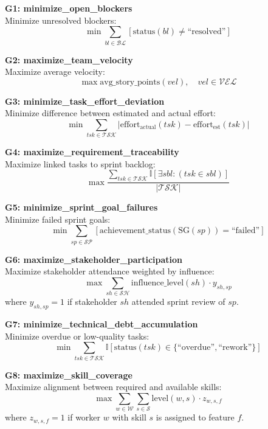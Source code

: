 \documentclass[12pt]{article}
\begin{document}
    \item \textbf{G1: minimize\_open\_blockers} \\
    Minimize unresolved blockers:
    \[
    \min \sum_{bl \in \mathcal{BL}} \left[ \text{status}(bl) \neq \text{``resolved''} \right]
    \]

    \item \textbf{G2: maximize\_team\_velocity} \\
    Maximize average velocity:
    \[
    \max \text{avg\_story\_points}(vel), \quad vel \in \mathcal{VEL}
    \]

    \item \textbf{G3: minimize\_task\_effort\_deviation} \\
    Minimize difference between estimated and actual effort:
    \[
    \min \sum_{tsk \in \mathcal{TSK}} | \text{effort}_{\text{actual}}(tsk) - \text{effort}_{\text{est}}(tsk) |
    \]

    \item \textbf{G4: maximize\_requirement\_traceability} \\
    Maximize linked tasks to sprint backlog:
    \[
    \max \frac{ \sum_{tsk \in \mathcal{TSK}} \mathbb{I}[\exists sbl : (tsk \in sbl)] }{ |\mathcal{TSK}| }
    \]

    \item \textbf{G5: minimize\_sprint\_goal\_failures} \\
    Minimize failed sprint goals:
    \[
    \min \sum_{sp \in \mathcal{SP}} \left[ \text{achievement\_status}(\text{SG}(sp)) = \text{``failed''} \right]
    \]

    \item \textbf{G6: maximize\_stakeholder\_participation} \\
    Maximize stakeholder attendance weighted by influence:
    \[
    \max \sum_{sh \in \mathcal{SH}} \text{influence\_level}(sh) \cdot y_{sh,sp}
    \]
    where $ y_{sh,sp} = 1 $ if stakeholder $ sh $ attended sprint review of $ sp $.

    \item \textbf{G7: minimize\_technical\_debt\_accumulation} \\
    Minimize overdue or low-quality tasks:
    \[
    \min \sum_{tsk \in \mathcal{TSK}} \mathbb{I}[\text{status}(tsk) \in \{\text{``overdue''}, \text{``rework''}\}]
    \]

    \item \textbf{G8: maximize\_skill\_coverage} \\
    Maximize alignment between required and available skills:
    \[
    \max \sum_{w \in \mathcal{W}} \sum_{s \in \mathcal{S}} \text{level}(w,s) \cdot z_{w,s,f}
    \]
    where $ z_{w,s,f} = 1 $ if worker $ w $ with skill $ s $ is assigned to feature $ f $.
\end{document}
